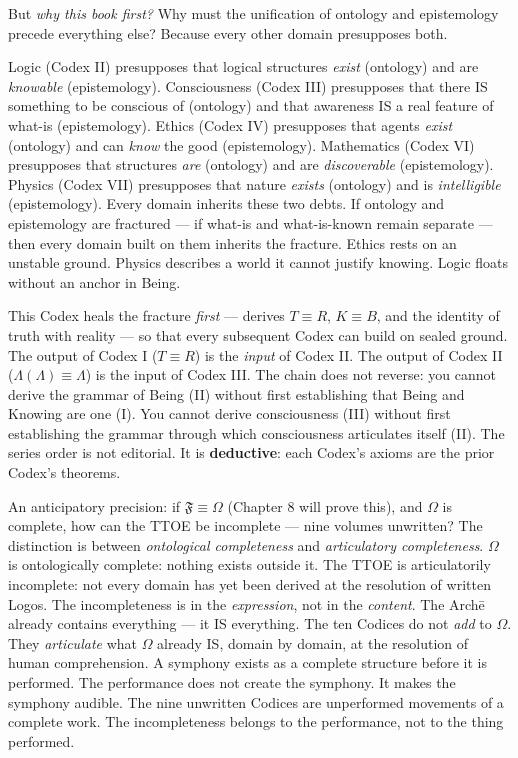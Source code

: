 \documentclass[10pt, openany, oneside]{book}
\begin{document}
\vspace{0.5em}

\noindent But \textit{why this book first?} Why must the unification of ontology and epistemology precede everything else? Because every other domain presupposes both.

\vspace{0.3em}

\noindent Logic (Codex II) presupposes that logical structures \textit{exist} (ontology) and are \textit{knowable} (epistemology). Consciousness (Codex III) presupposes that there IS something to be conscious of (ontology) and that awareness IS a real feature of what-is (epistemology). Ethics (Codex IV) presupposes that agents \textit{exist} (ontology) and can \textit{know} the good (epistemology). Mathematics (Codex VI) presupposes that structures \textit{are} (ontology) and are \textit{discoverable} (epistemology). Physics (Codex VII) presupposes that nature \textit{exists} (ontology) and is \textit{intelligible} (epistemology). Every domain inherits these two debts. If ontology and epistemology are fractured --- if what-is and what-is-known remain separate --- then every domain built on them inherits the fracture. Ethics rests on an unstable ground. Physics describes a world it cannot justify knowing. Logic floats without an anchor in Being.

\vspace{0.3em}

\noindent This Codex heals the fracture \textit{first} --- derives $T \equiv R$, $K \equiv B$, and the identity of truth with reality --- so that every subsequent Codex can build on sealed ground. The output of Codex I ($T \equiv R$) is the \textit{input} of Codex II. The output of Codex II ($\Lambda(\Lambda) \equiv \Lambda$) is the input of Codex III. The chain does not reverse: you cannot derive the grammar of Being (II) without first establishing that Being and Knowing are one (I). You cannot derive consciousness (III) without first establishing the grammar through which consciousness articulates itself (II). The series order is not editorial. It is \textbf{deductive}: each Codex's axioms are the prior Codex's theorems.

An anticipatory precision: if $\mathfrak{F} \equiv \Omega$ (Chapter 8 will prove this), and $\Omega$ is complete, how can the TTOE be incomplete --- nine volumes unwritten? The distinction is between \textit{ontological completeness} and \textit{articulatory completeness}. $\Omega$ is ontologically complete: nothing exists outside it. The TTOE is articulatorily incomplete: not every domain has yet been derived at the resolution of written Logos. The incompleteness is in the \textit{expression}, not in the \textit{content}. The Arch\={e} already contains everything --- it IS everything. The ten Codices do not \textit{add} to $\Omega$. They \textit{articulate} what $\Omega$ already IS, domain by domain, at the resolution of human comprehension. A symphony exists as a complete structure before it is performed. The performance does not create the symphony. It makes the symphony audible. The nine unwritten Codices are unperformed movements of a complete work. The incompleteness belongs to the performance, not to the thing performed.
\end{document}
